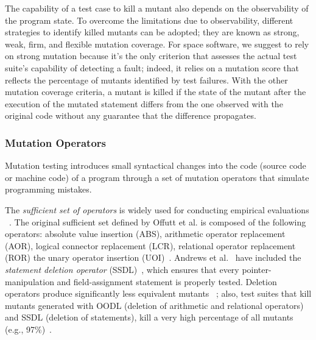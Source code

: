 The capability of a test case to kill a mutant also depends on the observability of the program state. To overcome the limitations due to observability, different strategies to identify killed mutants can be adopted; they are known as strong, weak, firm, and flexible mutation coverage. For space software, we suggest to rely on strong mutation because it's the only criterion that assesses the actual test suite's capability of detecting a fault; indeed, it relies on a mutation score that reflects the percentage of mutants identified by test failures. With the other mutation coverage criteria, a mutant is killed if the state of the mutant after the execution of the mutated statement differs from the one observed with the original code without any guarantee that the difference propagates. 




\subsubsection{Mutation Operators}
\label{sec:related:operators}




Mutation testing introduces small syntactical changes into the code (source code or machine code) of a program through a set of mutation operators that simulate programming mistakes. 



The  \emph{sufficient set of operators} is widely used for conducting empirical evaluations ~\cite{offutt1996experimental,rothermel1996experimental,andrews2005mutation,kintis2017detecting}. 
The original sufficient set defined by Offutt et al. is composed of the following operators: absolute value insertion (ABS), arithmetic operator replacement (AOR), logical connector replacement (LCR), relational operator replacement (ROR) the unary operator insertion (UOI)~\cite{offutt1996experimental}.
Andrews et al.~\cite{andrews2005mutation} have included the \emph{statement deletion operator} (SSDL)~\cite{delamaro2014designing}, which ensures that every pointer-manipulation and field-assignment statement is properly tested. 
Deletion operators produce significantly less equivalent mutants~
\cite{delamaro2014designing,delamaro2014experimental}; also, 
test suites that kill mutants generated with OODL (deletion of arithmetic and relational operators) and SSDL (deletion of statements), kill a very high percentage of all mutants (e.g., 97\%)~\cite{delamaro2014experimental}. 




